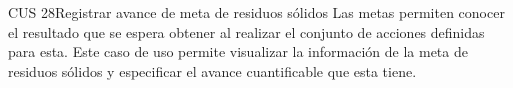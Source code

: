 
\begin{UseCase}{CUS 28}{Registrar avance de meta de residuos sólidos}
    {
	Las metas permiten conocer el resultado que se espera obtener al realizar el conjunto de acciones definidas para esta. Este caso de uso permite visualizar la información de la meta de residuos sólidos y especificar el avance cuantificable que esta tiene.
    }
    

    


\end{UseCase}
